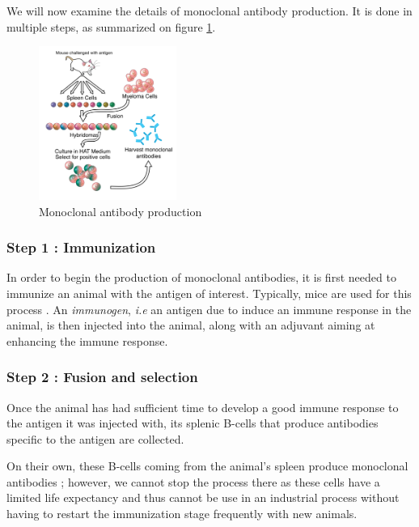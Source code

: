 We will now examine the details of monoclonal antibody production.
It is done in multiple steps, as summarized on figure \ref{fig:Monoclonal_Antibody_Production}.

\begin{figure}[H]
    \begin{center}
        \includegraphics[width=0.4\textwidth]{../Images/mab_hybridomas.png}
        \caption{Monoclonal antibody production}
        \label{fig:Monoclonal_Antibody_Production}
    \end{center}
\end{figure}


\subsubsection{Step 1 : Immunization}

In order to begin the production of monoclonal antibodies, it is first
needed to immunize an animal with the antigen of interest. Typically, 
mice are used for this process \cite{leenaars_critical_2005}. 
An \emph{immunogen}, \textit{i.e} an antigen due to induce an immune response
in the animal, is then injected into the animal, along with an adjuvant
aiming at enhancing the immune response.


\subsubsection{Step 2 : Fusion and selection}

Once the animal has had sufficient time to develop a good immune
response to the antigen it was injected with, its splenic B-cells
that produce antibodies specific to the antigen are collected.

On their own, these B-cells coming from the animal's spleen produce
monoclonal antibodies ; however, we cannot stop the process there
as these cells have a limited life expectancy and thus cannot be
use in an industrial process without having to restart the immunization
stage frequently with new animals.


